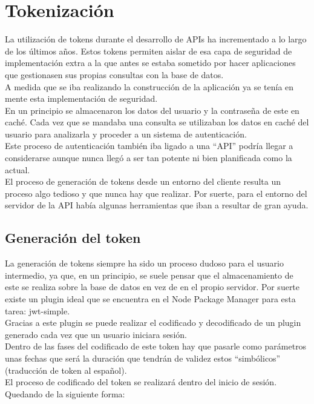 \section{Tokenización}

La utilización de tokens durante el desarrollo de APIs ha incrementado a lo largo de los últimos años. Estos tokens permiten aislar de esa capa de seguridad de implementación extra a la que antes se estaba sometido por hacer aplicaciones que gestionasen sus propias consultas con la base de datos.
\\A medida que se iba realizando la construcción de la aplicación ya se tenía en mente esta implementación de seguridad.
\\En un principio se almacenaron los datos del usuario y la contraseña de este en caché. Cada vez que se mandaba una consulta se utilizaban los datos en caché del usuario para analizarla y proceder a un sistema de autenticación.
\\Este proceso de autenticación también iba ligado a una ``API'' podría llegar a considerarse aunque nunca llegó a ser tan potente ni bien planificada como la actual.
\\El proceso de generación de tokens desde un entorno del cliente resulta un proceso algo tedioso y que nunca hay que realizar. Por suerte, para el entorno del servidor de la API había algunas herramientas que iban a resultar de gran ayuda.

\subsection{Generación del token}
La generación de tokens siempre ha sido un proceso dudoso para el usuario intermedio, ya que, en un principio, se suele pensar que el almacenamiento de este se realiza sobre la base de datos en vez de en el propio servidor. Por suerte existe un plugin ideal que se encuentra en el Node Package Manager para esta tarea: jwt-simple.
\\Gracias a este plugin se puede realizar el codificado y decodificado de un plugin generado cada vez que un usuario iniciara sesión.
\\Dentro de las fases del codificado de este token hay que pasarle como parámetros unas fechas que será la duración que tendrán de validez estos ``simbólicos'' (traducción de token al español).
\\El proceso de codificado del token se realizará dentro del inicio de sesión. Quedando de la siguiente forma:

